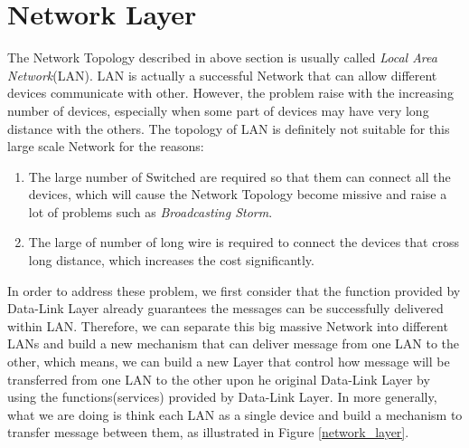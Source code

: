 \documentclass[10pt,a4paper]{article}
\begin{document}
\section{Network Layer}
The Network Topology described in above section is usually called \textit{Local Area Network}(LAN). LAN is actually a successful Network that can allow different devices communicate with other. However, the problem raise with the increasing number of devices, especially when some part of devices may have very long distance with the others. The topology of LAN is definitely not suitable for this large scale Network for the reasons:
\begin{enumerate}
	\item The large number of Switched are required so that them can connect all the devices, which will cause the Network Topology become missive and raise a lot of problems such as \textit{Broadcasting Storm}.
	\item The large of number of long wire is required to connect the devices that cross long distance, which increases the cost significantly. 
\end{enumerate}
In order to address these problem, we first consider that the function provided by Data-Link Layer already guarantees the messages can be successfully delivered within LAN. Therefore, we can separate this big massive Network into different LANs and build a new mechanism that can deliver message from one LAN to the other, which means, we can build a new Layer that control how message will be transferred from one LAN to the other upon he original Data-Link Layer by using the functions(services) provided by Data-Link Layer. In more generally, what we are doing is think each LAN as a single device and build a mechanism to transfer message between them, as illustrated in Figure \ref{network_layer}.
\end{document}
